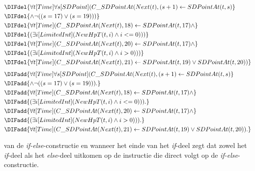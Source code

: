 \DIFdelbegin \begin{eqnarray*}
	&\DIFdel{\forall{t}[Time]\forall{s}[SDPoint](C\_SDPointAt(Next(t), (s+1) \leftarrow SDPointAt(t, s) }\\ &\DIFdel{\land \lnot{}((s = 17) \lor (s = 19))) }\\
	&\DIFdel{\forall{t}[Time](C\_SDPointAt(Next(t), 18) \leftarrow SDPointAt(t, 17) \land }\\ &\DIFdel{(\exists{i}[LimitedInt](NewHpT(t, i) \land i <= 0))) }\\
	&\DIFdel{\forall{t}[Time](C\_SDPointAt(Next(t), 20) \leftarrow SDPointAt(t, 17 ) \land }\\ &\DIFdel{(\exists{i}[LimitedInt](NewHpT(t, i) \land i > 0))) }\\
	&\DIFdel{\forall{t}[Time](C\_SDPointAt(Next(t), 21) \leftarrow SDPointAt(t, 19) \lor SDPointAt(t, 20))
}\end{eqnarray*}
\DIFdelend \DIFaddbegin \begin{align}
	&\DIFadd{\forall{t}[Time]\forall{s}[SDPoint](C\_SDPointAt(Next(t), (s+1) \leftarrow SDPointAt(t, s) \nonumber }\\ &\DIFadd{\land \lnot{}((s = 17) \lor (s = 19))). \label{eq:sdprog} }\\
	&\DIFadd{\forall{t}[Time](C\_SDPointAt(Next(t), 18) \leftarrow SDPointAt(t, 17) \land \nonumber }\\ &\DIFadd{(\exists{i}[LimitedInt](NewHpT(t, i) \land i <= 0))). \label{eq:sdif} }\\
	&\DIFadd{\forall{t}[Time](C\_SDPointAt(Next(t), 20) \leftarrow SDPointAt(t, 17 ) \land \nonumber }\\ &\DIFadd{(\exists{i}[LimitedInt](NewHpT(t, i) \land i > 0))). \label{eq:sdthen} }\\
	&\DIFadd{\forall{t}[Time](C\_SDPointAt(Next(t), 21) \leftarrow SDPointAt(t, 19) \lor SDPointAt(t, 20)). \label{eq:sdexit}
}\end{align}
\DIFaddend 

\DIFdelbegin {}\DIFdelend \DIFaddbegin {}\DIFaddend van de \textit{if-else}-constructie \DIFdelbegin {}\DIFdelend \DIFaddbegin {}\DIFaddend en wanneer het einde van het \textit{if}-deel \DIFdelbegin {}\DIFdelend \DIFaddbegin {}\DIFaddend \textit{\DIFdelbegin {}\DIFdelend \DIFaddbegin {}\DIFaddend }\DIFdelbegin {}\DIFdelend \DIFaddbegin {}\textit{}\DIFaddend zegt dat zowel het \textit{if}-deel als het \textit{else}-deel uitkomen op de instructie die direct volgt op de \textit{if-else}-constructie.

